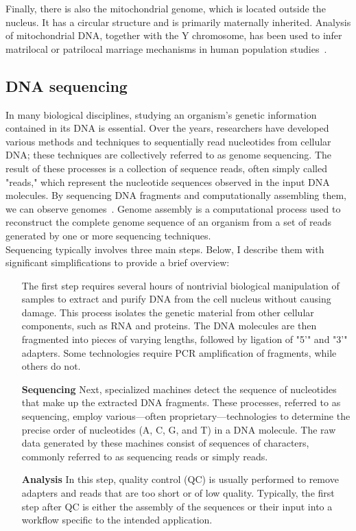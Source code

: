 Finally, there is also the mitochondrial genome, which is located outside the nucleus. It has a circular structure and is primarily maternally inherited. Analysis of mitochondrial DNA, together with the Y chromosome, has been used to infer matrilocal or patrilocal marriage mechanisms in human population studies~\cite{matrilocal}.

\subsection{DNA sequencing}
In many biological disciplines, studying an organism's genetic information contained in its DNA is essential. Over the years, researchers have developed various methods and techniques to sequentially read nucleotides from cellular DNA; these techniques are collectively referred to as genome sequencing. The result of these processes is a collection of sequence reads, often simply called "reads," which represent the nucleotide sequences observed in the input DNA molecules. By sequencing DNA fragments and computationally assembling them, we can observe genomes~\cite{garrison_pangenome}. Genome assembly is a computational process used to reconstruct the complete genome sequence of an organism from a set of reads generated by one or more sequencing techniques.\\
Sequencing typically involves three main steps. Below, I describe them with significant simplifications to provide a brief overview:
\begin{itemize}[leftmargin=1.8cm]
	 \item[\smash{\stackunder{\textbf{Library}}{\textbf{preparation}}}] The first step requires several hours of nontrivial biological manipulation of samples to extract and purify DNA from the cell nucleus without causing damage. This process isolates the genetic material from other cellular components, such as RNA and proteins. The DNA molecules are then fragmented into pieces of varying lengths, followed by ligation of "5'" and "3'" adapters. Some technologies require \gls{PCR} amplification of fragments, while others do not.
	\item[\textbf{Sequencing}]Next, specialized machines detect the sequence of nucleotides that make up the extracted DNA fragments. These processes, referred to as sequencing, employ various—often proprietary—technologies to determine the precise order of nucleotides (A, C, G, and T) in a DNA molecule. The raw data generated by these machines consist of sequences of characters, commonly referred to as sequencing reads or simply reads.
	\item[\textbf{Analysis}] In this step, quality control (\gls{QC}) is usually performed to remove adapters and reads that are too short or of low quality. Typically, the first step after QC is either the assembly of the sequences or their input into a workflow specific to the intended application.
\end{itemize}
